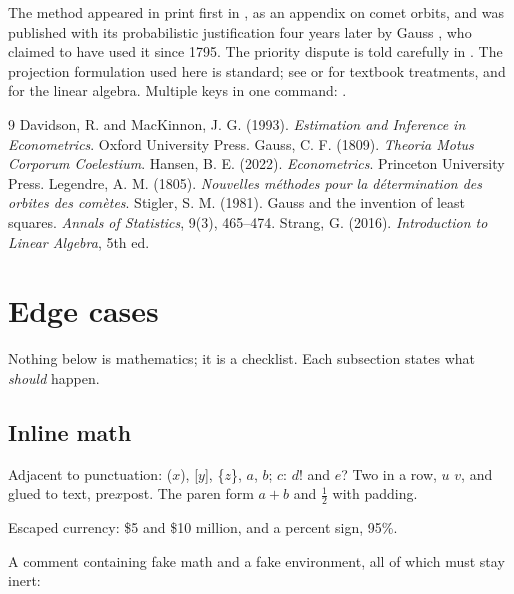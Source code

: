 \documentclass[11pt]{article}
\newtheorem{theorem}{Theorem}
\theoremstyle{definition}
\theoremstyle{remark}
\begin{document}
The method appeared in print first in \cite{legendre1805}, as an appendix on comet orbits, and was published with its probabilistic justification four years later by Gauss \cite{gauss1809}, who claimed to have used it since 1795. The priority dispute is told carefully in \cite[pp.~465--474]{stigler1981}. The projection formulation used here is standard; see \cite[ch.~3]{hansen2022} or \cite[\S1.4]{davidson1993} for textbook treatments, and \cite{strang2016} for the linear algebra. Multiple keys in one command: \cite{legendre1805,gauss1809,stigler1981}.

\begin{thebibliography}{9}
 Davidson, R. and MacKinnon, J. G. (1993).
  \emph{Estimation and Inference in Econometrics}. Oxford University Press.
 Gauss, C. F. (1809).
  \emph{Theoria Motus Corporum Coelestium}.
 Hansen, B. E. (2022).
  \emph{Econometrics}. Princeton University Press.
 Legendre, A. M. (1805).
  \emph{Nouvelles m\'ethodes pour la d\'etermination des orbites des com\`etes}.
 Stigler, S. M. (1981). Gauss and the invention of least
  squares. \emph{Annals of Statistics}, 9(3), 465--474.
 Strang, G. (2016).
  \emph{Introduction to Linear Algebra}, 5th ed.
\end{thebibliography}

\section{Edge cases}
\label{sec:edge}

Nothing below is mathematics; it is a checklist. Each subsection states what \emph{should} happen.

\subsection{Inline math}

Adjacent to punctuation: ($x$), [$y$], \{$z$\}, $a$, $b$; $c$: $d$! and $e$?
Two in a row, $u$ $v$, and glued to text, pre$x$post. The paren form
\(a + b\) and \( \tfrac{1}{2} \) with padding.

Escaped currency: \$5 and \$10 million, and a percent sign, 95\%.

A comment containing fake math and a fake environment, all of which must stay inert: %
\end{document}
